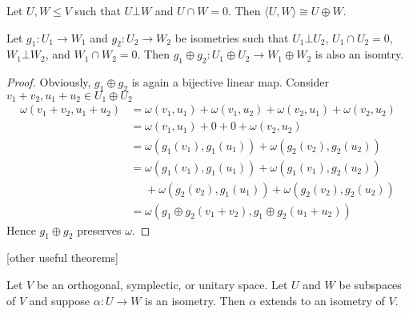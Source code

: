 \begin{lemma}
Let $U,W\leq V$ such that $U\bot W$ and $U\cap W=0$. Then $\langle U,W\rangle\cong U\oplus W$.
\end{lemma}
\begin{lemma}\label{lem:isomSum}
Let $g_1\colon U_1\to W_1$ and $g_2\colon U_2\to W_2$ be isometries such that $U_1\bot U_2$, $U_1\cap U_2=0$, $W_1\bot W_2$, and $W_1\cap W_2=0$.
Then $g_1\oplus g_2\colon U_1\oplus U_2\to W_1\oplus W_2$ is also an isomtry.
\end{lemma}
\begin{proof}
Obviously, $g_1\oplus g_2$ is again a bijective linear map. Consider $v_1+v_2, u_1+u_2\in U_1\oplus U_2$
\begin{align*}
\omega(v_1+v_2, u_1+u_2)&=\omega(v_1, u_1)+\omega(v_1, u_2)+\omega(v_2, u_1)+\omega(v_2, u_2)\\
&=\omega(v_1, u_1)+0+0+\omega(v_2, u_2) \tag{$U_1\bot U_2$}\\
&=\omega(g_1(v_1), g_1(u_1))+\omega(g_2(v_2), g_2(u_2))\\
&=\omega(g_1(v_1), g_1(u_1))+\omega(g_1(v_1), g_2(u_2))\\ &\phantom{={}}+\omega(g_2(v_2), g_1(u_1))+\omega(g_2(v_2), g_2(u_2))\tag{$W_1\bot W_2$}\\
&=\omega(g_1\oplus g_2(v_1+v_2), g_1\oplus g_2(u_1+u_2))
\end{align*}
Hence $g_1\oplus g_2$ preserves $\omega$.
\end{proof}

[other useful theorems]


\begin{theorem}[Witt]
Let $V$ be an orthogonal, symplectic, or unitary space. Let $U$ and $W$ be subspaces of $V$ and suppose $\alpha\colon U\to W$ is an isometry. Then $\alpha$ extends to an isometry of $V$.
\end{theorem}

